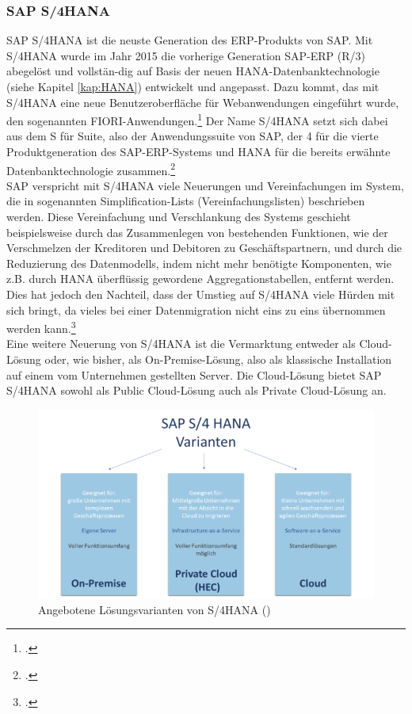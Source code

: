 \subsubsection{SAP S/4HANA}
\label{kap:S4HANA} 
SAP S/4HANA ist die neuste Generation des ERP-Produkts von SAP. Mit S/4HANA wurde im Jahr 2015 die vorherige Generation SAP-ERP (R/3) abegelöst und vollstän-dig auf Basis der neuen HANA-Datenbanktechnologie (siehe Kapitel \ref{kap:HANA}) entwickelt und angepasst. Dazu kommt, das mit S/4HANA eine neue Benutzeroberfläche für Webanwendungen eingeführt wurde, den sogenannten FIORI-Anwendungen.\footcite[Vgl.][]{was-hana} Der Name \glqq{}S/4HANA\grqq{} setzt sich dabei aus dem \glqq{}S\grqq{} für \glqq{}Suite\grqq{}, also der Anwendungssuite von SAP, der \glqq{}4\grqq{} für die vierte Produktgeneration des SAP-ERP-Systems und \glqq{}HANA\grqq{} für die bereits erwähnte Datenbanktechnologie zusammen.\footcite[Vgl.][]{rz10-s4hana}\\SAP verspricht mit S/4HANA viele Neuerungen und Vereinfachungen im System, die in sogenannten \glqq{}Simplification-Lists\grqq{} (Vereinfachungslisten) beschrieben werden. Diese Vereinfachung und Verschlankung des Systems geschieht beispielsweise durch das Zusammenlegen von bestehenden Funktionen, wie der Verschmelzen der Kreditoren und Debitoren zu Geschäftspartnern, und durch die Reduzierung des Datenmodells, indem nicht mehr benötigte Komponenten, wie z.B. durch HANA überflüssig gewordene Aggregationstabellen, entfernt werden. Dies hat jedoch den Nachteil, dass der Umstieg auf S/4HANA viele Hürden mit sich bringt, da vieles bei einer Datenmigration nicht eins zu eins übernommen werden kann.\footcite[Vgl.][]{ibsolution}\\Eine weitere Neuerung von S/4HANA ist die Vermarktung entweder als Cloud-Lösung oder, wie bisher, als On-Premise-Lösung, also als klassische Installation auf einem vom Unternehmen gestellten Server. Die Cloud-Lösung bietet SAP S/4HANA sowohl als \glqq{}Public Cloud\grqq{}-Lösung auch als \glqq{}Private Cloud\grqq{}-Lösung an.
\begin{figure}[h]
    \centering
    \includegraphics[scale=1.3]{./Bilder/HANA-Varianten.png}
    \caption[S/4HANA Lösungen]{Angebotene Lösungsvarianten von S/4HANA (\cite[][]{rz10-s4hana})}
\end{figure}
